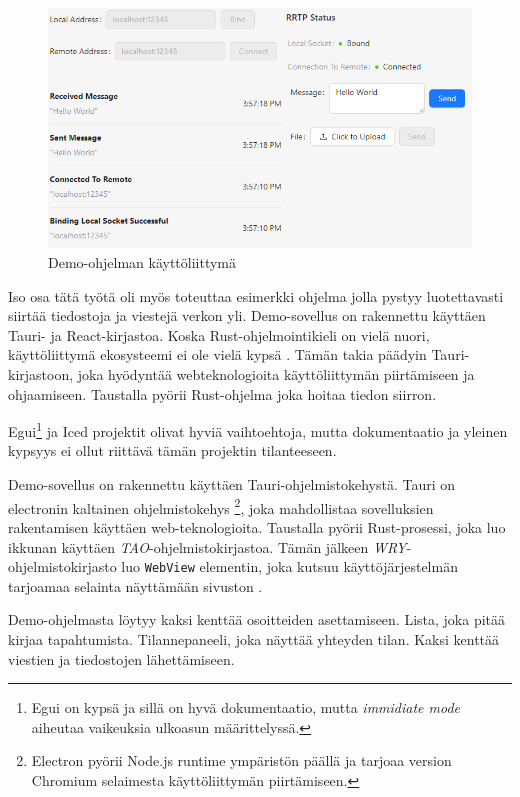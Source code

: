 \documentclass[a4paper,12pt]{article}
\begin{document}
    \begin{figure}[h!]
        \centering
        \includegraphics[width=\textwidth]{doc/latex/src/images/RRTP.png}
        \caption{Demo-ohjelman käyttöliittymä}
        \label{fig:demo_interface}
    \end{figure}
    
    Iso osa tätä työtä oli myös toteuttaa esimerkki ohjelma jolla pystyy luotettavasti siirtää tiedostoja ja viestejä verkon yli. Demo-sovellus on rakennettu käyttäen Tauri- ja React-kirjastoa. Koska Rust-ohjelmointikieli on vielä nuori, käyttöliittymä ekosysteemi ei ole vielä kypsä \cite{AreYet}. Tämän takia päädyin Tauri-kirjastoon, joka hyödyntää webteknologioita käyttöliittymän piirtämiseen ja ohjaamiseen. Taustalla pyörii Rust-ohjelma joka hoitaa tiedon siirron. \par
    Egui\footnote{Egui on kypsä ja sillä on hyvä dokumentaatio, mutta \textit{immidiate mode} aiheutaa vaikeuksia ulkoasun määrittelyssä. } ja Iced projektit olivat hyviä vaihtoehtoja, mutta dokumentaatio ja yleinen kypsyys ei ollut riittävä tämän projektin tilanteeseen. \par


    Demo-sovellus on rakennettu käyttäen Tauri-ohjelmistokehystä.
    Tauri on electronin kaltainen ohjelmistokehys \footnote{Electron pyörii Node.js runtime ympäristön päällä ja tarjoaa version Chromium selaimesta käyttöliittymän piirtämiseen.}, joka mahdollistaa sovelluksien rakentamisen käyttäen web-teknologioita. Taustalla pyörii Rust-prosessi, joka luo ikkunan käyttäen \textit{TAO}-ohjelmistokirjastoa. Tämän jälkeen \textit{WRY}-ohjelmistokirjasto luo \lstinline{WebView} elementin, joka kutsuu käyttöjärjestelmän tarjoamaa selainta näyttämään sivuston \cite{tauri-app}.

    Demo-ohjelmasta löytyy kaksi kenttää osoitteiden asettamiseen. Lista, joka 
    pitää kirjaa tapahtumista. Tilannepaneeli, joka näyttää yhteyden tilan. 
    Kaksi kenttää viestien ja tiedostojen lähettämiseen. \par
\end{document}
